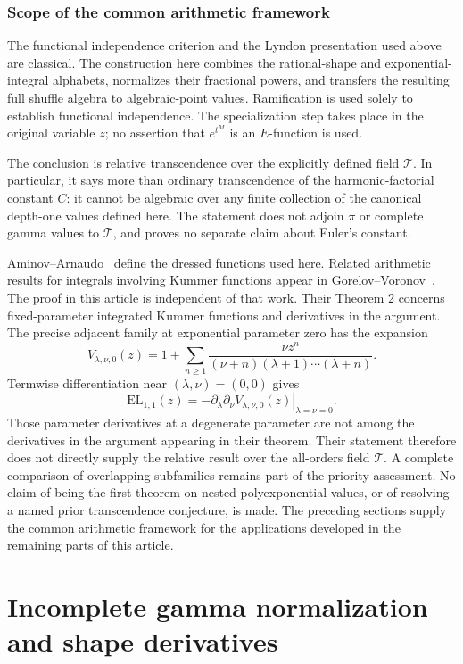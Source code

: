 \documentclass[11pt,a4paper]{article}
\newcommand{\T}{\mathcal T}
\newcommand{\EL}{\mathrm{EL}}
\theoremstyle{definition}
\theoremstyle{remark}
\numberwithin{equation}{section}
\begin{document}
\section{Scope of the common arithmetic framework}
The functional independence criterion and the Lyndon presentation used
above are classical. The construction here combines the rational-shape
and exponential-integral alphabets, normalizes their fractional powers,
and transfers the resulting full shuffle algebra to algebraic-point values.
Ramification is used solely to establish functional independence.
The specialization step takes place in the original variable $z$;
no assertion that $e^{t^M}$ is an $E$-function is used.

The conclusion is relative transcendence over the explicitly defined
field $\T$. In particular, it says more than ordinary transcendence of
the harmonic-factorial constant $C$: it cannot be algebraic over any
finite collection of the canonical depth-one values defined here. The statement does not
adjoin $\pi$ or complete gamma values to $\T$, and proves no separate
claim about Euler's constant.

Aminov--Arnaudo~\cite{AA} define the dressed functions used here.
Related arithmetic results for integrals involving Kummer functions
appear in Gorelov--Voronov~\cite{GV}. The proof in this article is independent
of that work. Their Theorem 2 concerns fixed-parameter integrated
Kummer functions and derivatives in the argument. The precise adjacent
family at exponential parameter zero has the expansion
\[
 V_{\lambda,\nu,0}(z)
 =1+\sum_{n\ge1}\frac{\nu z^n}
 {(\nu+n)(\lambda+1)\cdots(\lambda+n)}.
\]
Termwise differentiation near $(\lambda,\nu)=(0,0)$ gives
\[
 \EL_{1,1}(z)
 =-\left.\partial_\lambda\partial_\nu
 V_{\lambda,\nu,0}(z)\right|_{\lambda=\nu=0}.
\]
Those parameter derivatives at a degenerate parameter are not among
the derivatives in the argument appearing in their theorem. Their
statement therefore does not directly supply the relative result over
the all-orders field $\T$. A complete comparison of overlapping
subfamilies remains part of the priority assessment.
No claim of being the first theorem
on nested polyexponential values, or of resolving a named prior
transcendence conjecture, is made. The preceding sections supply the common arithmetic framework
for the applications developed in the remaining parts of this article.



\clearpage
\part{Incomplete gamma normalization and shape derivatives}\label{part:normalization}
\end{document}
